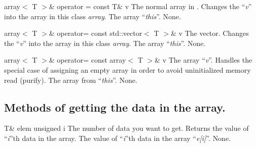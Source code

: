 

\setNormalInstance
\printMethodWithOneParam
{array$<$ T $>$\&}
{operator =}
{const T\&}
{v}
{The normal array in \cpp.}
{Changes the ``{\em v}'' into the array in this class {\em array}.}
{The array ``{\em this}''.}
{None.}

\clearpage

\setNormalInstance
\printMethodWithOneParam
{array$<$ T $>$\&}
{operator=}
{const std::vector$<$ T $>$\&}
{v}
{The vector.}
{Changes the ``{\em v}'' into the array in this class {\em array}.}
{The array ``{\em this}''.}
{None.}

\setNormalInstance
\printMethodWithOneParam
{array$<$ T $>$\&}
{operator=}
{const array$<$ T $>$\&}
{v}
{The array ``{\em v}''.}
{Handles the special case of assigning an empty array in order to
avoid uninitialized memory read (purify).}
{The array from ``{\em this}''.}
{None.}

\clearpage

\subsection{Methods of getting the data in the array.}

\setNormalInstance
\printMethodWithOneParam
{T\&}
{elem}
{unsigned}
{i}
{The number of data you want to get.}
{Returns the value of ``{\em i}''th data in the array.}
{The value of ``{\em i}''th data in the array ``{\em e[i]}''.}
{None.}


